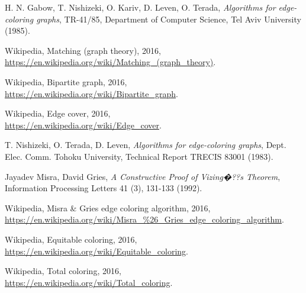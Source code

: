 \documentclass[12pt,a4paper]{mwrep}
\begin{document}
\begin{thebibliography}{99}
H. N. Gabow, T. Nishizeki, O. Kariv, D. Leven, O. Terada, 
\emph{Algorithms for edge-coloring graphs}, 
TR-41/85, Department of Computer Science, Tel Aviv University (1985).

Wikipedia, Matching (graph theory), 2016,\\
\url{https://en.wikipedia.org/wiki/Matching_(graph_theory)}.

Wikipedia, Bipartite graph, 2016,\\
\url{https://en.wikipedia.org/wiki/Bipartite_graph}.

Wikipedia, Edge cover, 2016,\\
\url{https://en.wikipedia.org/wiki/Edge_cover}.

T. Nishizeki, O. Terada, D. Leven,
\emph{Algorithms for edge-coloring graphs}, 
Dept. Elec. Comm. Tohoku University, 
Technical Report TRECIS 83001 (1983). 

Jayadev Misra, David Gries,
\emph{A Constructive Proof of Vizing�??s Theorem},
Information Processing Letters 41 (3), 131-133 (1992).

Wikipedia, Misra \& Gries edge coloring algorithm, 2016,\\
\url{https://en.wikipedia.org/wiki/Misra_%26_Gries_edge_coloring_algorithm}.


Wikipedia, Equitable coloring, 2016,\\
\url{https://en.wikipedia.org/wiki/Equitable_coloring}.

Wikipedia, Total coloring, 2016,\\
\url{https://en.wikipedia.org/wiki/Total_coloring}.


\end{thebibliography}
\end{document}

